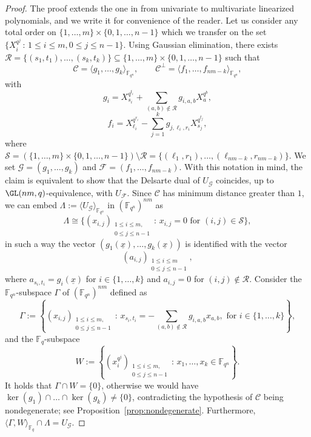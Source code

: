 \begin{proof}
The proof extends the one in \cite[Theorem 4.12]{csajbok2021generalising} from univariate to multivariate linearized polynomials, and we write it for convenience of the reader.
    Let us consider any total order on $\{1,\ldots,m\}\times \{0,1,\ldots,n-1\}$ which we transfer on the set $\{X_i^{q^{j}} \,:\, 1\leq i \leq m, 0 \leq j \leq n-1\}$. Using Gaussian elimination, there exists $\mathcal R=\{(s_1,t_1),\ldots,(s_k,t_k)\}\subseteq\{1,\ldots,m\}\times \{0,1,\ldots,n-1\}$  such that
    $$\mathcal{C}=\langle g_1,\ldots,g_k\rangle_{{\mathbb F}_{q^n}}, \qquad \mathcal{C}^\perp=\langle f_1,\ldots,f_{nm-k}\rangle_{{\mathbb F}_{q^n}},$$
    with 
    $$g_i=X_{s_i}^{q^{t_i}}+\sum_{(a,b)\notin \mathcal R}g_{i,a,b}X_a^{q^b},$$
    $$f_i=X_{\ell_i}^{q^{r_i}}-\sum_{j=1}^kg_{j,\ell_i,r_i}X_{s_j}^{q^{t_j}},$$
    where $\mathcal S=(\{1,\ldots,m\}\times \{0,1,\ldots,n-1\})\setminus \mathcal R=\{(\ell_1,r_1),\ldots,(\ell_{nm-k},r_{nm-k})\}$. We set $\mathcal G=(g_1,\ldots,g_k)$ and $\mathcal F=(f_1,\ldots,f_{nm-k})$. With this notation in mind, the claim is equivalent to show that the Delsarte dual of $U_{\mathcal G}$ coincides, up to $\GL(nm,q)$-equivalence, with $U_{\mathcal F}$. 
    Since $\mathcal{C}$ has minimum distance greater than $1$, we can embed $\Lambda:=\langle U_{\mathcal G}\rangle_{{\mathbb F}_{q^n}}$ in $(\mathbb{F}_{q^n})^{nm}$ as 
    $$\Lambda \cong \{(x_{i,j})_{\substack{1\leq i \leq m,\\ 0 \leq j \leq n-1}} \,:\, x_{i,j}=0 \mbox{ for } (i,j) \in \mathcal S\},$$
    in such a way the vector $(g_1(\underline{x}),\ldots,g_k(\underline{x}))$ is identified with the vector
    $$(a_{i,j})_{\substack{1\leq i \leq m\\  0 \leq j \leq n-1}},$$
    where $a_{s_i,t_i}=g_i(\underline{x})$ for $i\in\{1,\ldots,k\}$ and $a_{i,j}=0$ for $(i,j)\notin \mathcal R$. Consider the ${\mathbb F}_{q^n}$-subspace $\Gamma$ of $(\mathbb{F}_{q^n})^{nm}$ defined as
    $$\Gamma:= \left\{  (x_{i,j})_{\substack{1\leq i \leq m,\\  0 \leq j \leq n-1}}  \,:\, x_{s_i,t_i}=-\sum_{(a,b)\notin \mathcal R}g_{i,a,b}x_{a,b}, \mbox{ for } i\in\{1,\ldots,k\} \right\},$$
    and the $\mathbb{F}_q$-subspace 
    $$W:= \left\{  \left(x_{i}^{q^j}\right)_{\substack{1\leq i \leq m,\\  0 \leq j \leq n-1}}  \,:\, x_1,\ldots,x_k\in{\mathbb F}_{q^n}\right\}.$$
    It holds that $\Gamma\cap W=\{0\}$, otherwise we would have $\ker(g_1)\cap\ldots\cap\ker(g_k)\neq\{0\}$, contradicting the hypothesis of $\mathcal{C}$ being nondegenerate; see Proposition~\ref{prop:nondegenerate}. Furthermore, $\langle \Gamma, W\rangle_{\mathbb{F}_q}\cap\Lambda=U_{\mathcal G}$.

\end{proof}
